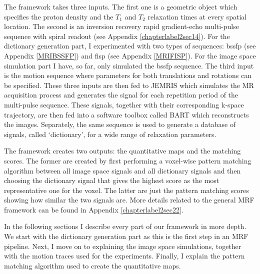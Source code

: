 The framework takes three inputs.
The first one is a geometric object which specifies the proton density and the $T_1$ and $T_2$ relaxation times at every spatial location.
The second is an inversion recovery rapid gradient-echo multi-pulse sequence with spiral readout (see Appendix \ref{chapterlabel2sec14}). 
For the dictionary generation part, I experimented with two types of sequences: \ac{bssfp} (see Appendix \ref{MRIBSSFP}) and \ac{fisp} (see Appendix \ref{MRIFISP}).
For the image space simulation part I have, so far, only simulated the \ac{bssfp} sequence.
The third input is the motion sequence where parameters for both translations and rotations can be specified.
These three inputs are then fed to JEMRIS which simulates the MR acquisition process and generates the signal for each repetition period of the multi-pulse sequence.
These signals, together with their corresponding k-space trajectory, are then fed into a software toolbox called BART \cite{Lustig2016} which reconstructs the images.
Separately, the same sequence is used to generate a database of signals, called `dictionary', for a wide range of relaxation parameters.

\hfill

The framework creates two outputs: the quantitative maps and the matching scores.
The former are created by first performing a voxel-wise pattern matching algorithm between all image space signals and all dictionary signals and then choosing the dictionary signal that gives the highest score as the most representative one for the voxel.
The latter are just the pattern matching scores showing how similar the two signals are.
More details related to the general MRF framework can be found in Appendix \ref{chapterlabel2sec22}.

\hfill

In the following sections I describe every part of our framework in more depth.
We start with the dictionary generation part as this is the first step in an MRF pipeline.
Next, I move on to explaining the image space simulations, together with the motion traces used for the experiments.
Finally, I explain the pattern matching algorithm used to create the quantitative maps.

\hfill

